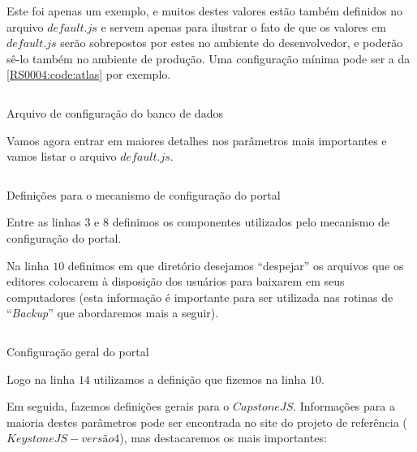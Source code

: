 Este foi apenas um exemplo, e muitos destes valores estão também definidos no arquivo $default.js$ e servem apenas para ilustrar o fato de que os valores em $default.js$ serão sobrepostos por estes no ambiente do desenvolvedor, e poderão sê-lo também no ambiente de produção. Uma configuração mínima pode ser a da \cref{RS0004:code:atlas} por exemplo.

\begin{code}
    \inputminted[label=atlas.js]{JavaScript}{../RS0004/anexos/atlas.js}
    \caption{Arquivo de configuração do banco de dados}\label{RS0004:code:atlas}
\end{code}

Vamos agora entrar em maiores detalhes nos parâmetros mais importantes e vamos listar o arquivo $default.js$.

\begin{code}
    \inputminted[label=default.js,firstline=1,lastline=10]{JavaScript}{../RS0004/anexos/default.js}
    \caption{Definições para o mecanismo de configuração do portal}\label{RS0004:code:default-head}
\end{code}

Entre as linhas $3$ e $8$ definimos os componentes utilizados pelo mecanismo de configuração do portal.

Na linha $10$ definimos em que diretório desejamos ``despejar'' os arquivos que os editores colocarem à disposição dos usuários para baixarem em seus computadores (esta informação é importante para ser utilizada nas rotinas de ``\textit{Backup}'' que abordaremos mais a seguir).

\begin{code}
    \inputminted[label=default.js,firstline=12,lastline=86]{JavaScript}{../RS0004/anexos/default.js}
    \caption{Configuração geral do portal}\label{RS0004:code:default-body}
\end{code}

Logo na linha $14$ utilizamos a definição que fizemos na linha $10$.

Em seguida, fazemos definições gerais para o $CapstoneJS$. Informações para a maioria destes parâmetros pode ser encontrada no site do projeto de referência ($KeystoneJS - versão 4$), mas destacaremos os mais importantes:

